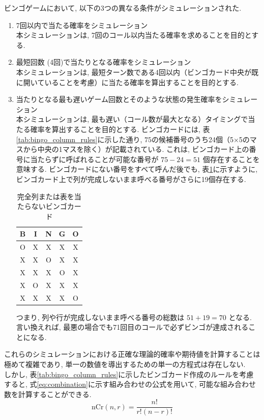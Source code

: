 \documentclass[a4j, 12pt ]{jarticle}
\begin{document}
ビンゴゲームにおいて, 以下の3つの異なる条件がシミュレーションされた.
\begin{enumerate}
  \item 7回以内で当たる確率をシミュレーション\\
  本シミュレーションは, 7回のコール以内当たる確率を求めることを目的とする.
  \item 最短回数 (4回)で当たりとなる確率をシミュレーション\\
  本シミュレーションは, 最短ターン数である4回以内（ビンゴカード中央が既に開いていることを考慮）に当たる確率を算出することを目的とする.
  \item 当たりとなる最も遅いゲーム回数とそのような状態の発生確率をシミュレーション\\
  本シミュレーションは, 最も遅い（コール数が最大となる）タイミングで当たる確率を算出することを目的とする. ビンゴカードには, 表\ref{tab:bingo_column_rules}に示した通り, $75$の候補番号のうち24個（5×5のマスから中央の1マスを除く）が記載されている. これは, ビンゴカード上の番号に当たらずに呼ばれることが可能な番号が $75 - 24 = 51$ 個存在することを意味する. ビンゴカードにない番号をすべて呼んだ後でも, 表\ref{tab:bingo_card}に示すように, ビンゴカード上で列が完成しないまま呼べる番号がさらに19個存在する.\\

  \begin{table}[H]
    \centering
    \caption{完全列または表を当たらないビンゴカード}\label{tab:bingo_card}
    \begin{tabular}{|c|c|c|c|c|}
      \hline
      B&I&N&G&O\\ \hline
      O & X & X & X & X \\ \hline
      X & X & O & X & X \\ \hline
      X & X & X & O & X \\ \hline
      X & O & X & X & X \\ \hline
      X & X & X & X & O \\ \hline
    \end{tabular}
  \end{table}
  つまり, 列や行が完成しないまま呼べる番号の総数は $51 + 19 = 70$ となる. 言い換えれば, 最悪の場合でも71回目のコールで必ずビンゴが達成されることになる.
\end{enumerate}
これらのシミュレーションにおける正確な理論的確率や期待値を計算することは極めて複雑であり, 単一の数値を導出するための単一の方程式は存在しない.\\

しかし, 表\ref{tab:bingo_column_rules}に示したビンゴカード作成のルールを考慮すると, 式\ref{eq:combination}に示す組み合わせの公式を用いて, 可能な組み合わせ数を計算することができる.
\begin{equation}\label{eq:combination}
  \mathrm{nCr}(n, r) = \frac{n!}{r!(n-r)!}
\end{equation}
\end{document}
